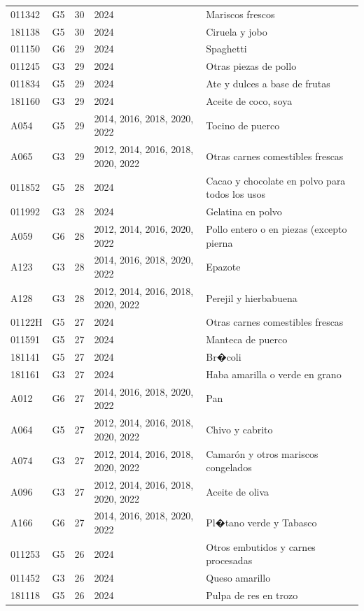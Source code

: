 \begin{table}[ht]
\begin{tabular}{llrll}
  011342 & G5 &  30 & 2024 & Mariscos frescos \\ 
  181138 & G5 &  30 & 2024 & Ciruela y jobo \\ 
  011150 & G6 &  29 & 2024 & Spaghetti \\ 
  011245 & G3 &  29 & 2024 & Otras piezas de pollo \\ 
  011834 & G5 &  29 & 2024 & Ate y dulces a base de frutas \\ 
  181160 & G3 &  29 & 2024 & Aceite de coco, soya \\ 
  A054 & G5 &  29 & 2014, 2016, 2018, 2020, 2022 & Tocino de puerco \\ 
  A065 & G3 &  29 & 2012, 2014, 2016, 2018, 2020, 2022 & Otras carnes comestibles frescas \\ 
  011852 & G5 &  28 & 2024 & Cacao y chocolate en polvo para todos los usos \\ 
  011992 & G3 &  28 & 2024 & Gelatina en polvo \\ 
  A059 & G6 &  28 & 2012, 2014, 2016, 2020, 2022 & Pollo entero o en piezas (excepto pierna \\ 
  A123 & G3 &  28 & 2014, 2016, 2018, 2020, 2022 & Epazote \\ 
  A128 & G3 &  28 & 2012, 2014, 2016, 2018, 2020, 2022 & Perejil y hierbabuena \\ 
  01122H & G5 &  27 & 2024 & Otras carnes comestibles frescas \\ 
  011591 & G5 &  27 & 2024 & Manteca de puerco \\ 
  181141 & G5 &  27 & 2024 & Br�coli \\ 
  181161 & G3 &  27 & 2024 & Haba amarilla o verde en grano \\ 
  A012 & G6 &  27 & 2014, 2016, 2018, 2020, 2022 & Pan \\ 
  A064 & G5 &  27 & 2012, 2014, 2016, 2018, 2020, 2022 & Chivo y cabrito \\ 
  A074 & G3 &  27 & 2012, 2014, 2016, 2018, 2020, 2022 & Camarón y otros mariscos congelados \\ 
  A096 & G3 &  27 & 2012, 2014, 2016, 2018, 2020, 2022 & Aceite de oliva \\ 
  A166 & G6 &  27 & 2014, 2016, 2018, 2020, 2022 & Pl�tano verde y Tabasco \\ 
  011253 & G5 &  26 & 2024 & Otros embutidos y carnes procesadas \\ 
  011452 & G3 &  26 & 2024 & Queso amarillo \\ 
  181118 & G5 &  26 & 2024 & Pulpa de res en trozo \\ 

\end{tabular}
\end{table}
